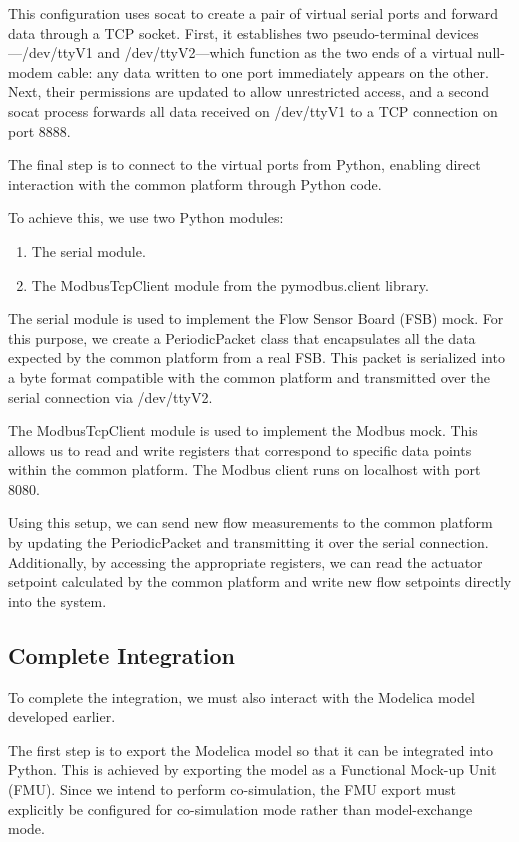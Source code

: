 \documentclass[we,final,11pt,oneside,openany]{uantwerpenbamathesis}
\begin{document}
This configuration uses socat to create a pair of virtual serial ports and forward data through a TCP socket.
First, it establishes two pseudo-terminal devices—/dev/ttyV1 and /dev/ttyV2—which function as the two ends of a virtual null-modem cable: any data written to one port immediately appears on the other.
Next, their permissions are updated to allow unrestricted access, and a second socat process forwards all data received on /dev/ttyV1 to a TCP connection on port 8888.

The final step is to connect to the virtual ports from Python, enabling direct interaction with the common platform through Python code.

To achieve this, we use two Python modules:
\begin{enumerate}
    \item The serial module.
    \item The ModbusTcpClient module from the pymodbus.client library.
\end{enumerate}

The serial module is used to implement the Flow Sensor Board (FSB) mock.
For this purpose, we create a PeriodicPacket class that encapsulates all the data expected by the common platform from a real FSB.
This packet is serialized into a byte format compatible with the common platform and transmitted over the serial connection via /dev/ttyV2.

The ModbusTcpClient module is used to implement the Modbus mock.
This allows us to read and write registers that correspond to specific data points within the common platform.
The Modbus client runs on localhost with port 8080.

Using this setup, we can send new flow measurements to the common platform by updating the PeriodicPacket and transmitting it over the serial connection.
Additionally, by accessing the appropriate registers, we can read the actuator setpoint calculated by the common platform and write new flow setpoints directly into the system.

\subsection{Complete Integration}
\label{subsec:complete-integration}

To complete the integration, we must also interact with the Modelica model developed earlier.

The first step is to export the Modelica model so that it can be integrated into Python.
This is achieved by exporting the model as a Functional Mock-up Unit (FMU).
Since we intend to perform co-simulation, the FMU export must explicitly be configured for co-simulation mode rather than model-exchange mode.
\end{document}
